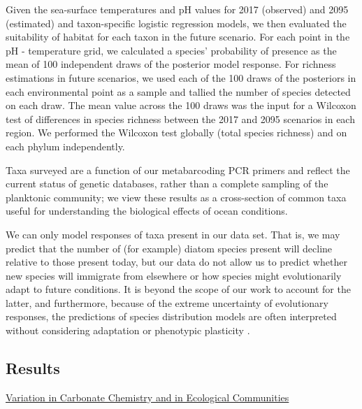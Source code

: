 \documentclass[11pt]{article}
\begin{document}
\begin{linenumbers}
Given the sea-surface temperatures and pH values for 2017 (observed) and 2095 (estimated) and taxon-specific logistic regression models, we then evaluated the suitability of habitat for each taxon in the future scenario. For each point in the pH - temperature grid, we calculated a species' probability of presence as the mean of 100 independent draws of the posterior model response. For richness estimations in future scenarios, we used each of the 100 draws of the posteriors in each environmental point as a sample and tallied the number of species detected on each draw. The mean value across the 100 draws was the input for a Wilcoxon test of differences in species richness between the 2017 and 2095 scenarios in each region. We performed the Wilcoxon test globally (total species richness) and on each phylum independently. 

Taxa surveyed are a function of our metabarcoding PCR primers \cite{leray_new_2013} and reflect the current status of genetic databases, rather than a complete sampling of the planktonic community; we view these results as a cross-section of common taxa useful for understanding the biological effects of ocean conditions.

We can only model responses of taxa present in our data set. That is, we may predict that the number of (for example) diatom species present will decline relative to those present today, but our data do not allow us to predict whether new species will immigrate from elsewhere or how species might evolutionarily adapt to future conditions. It is beyond the scope of our work to account for the latter, and furthermore, because of the extreme uncertainty of evolutionary responses, the predictions of species distribution models are often interpreted without considering adaptation or phenotypic plasticity \cite{moore2015present}. 



\subsection*{Results}
\underline{Variation in Carbonate Chemistry and in Ecological Communities}



\end{linenumbers}
\end{document}
